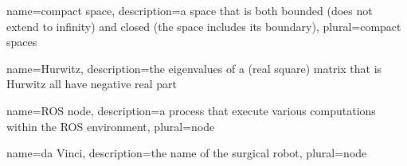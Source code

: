 {name={compact space},
 description={a space that is both bounded (does not extend to infinity) and closed (the space includes its boundary)},
 plural={compact spaces}
}

{name={Hurwitz},
 description={the eigenvalues of a (real square) matrix that is Hurwitz all have negative real part}
}

{name=ROS node,
 description={a process that execute various computations within the ROS environment},
 plural={node}
}


{name=da Vinci,
 description={the name of the surgical robot},
 plural={node}
}

